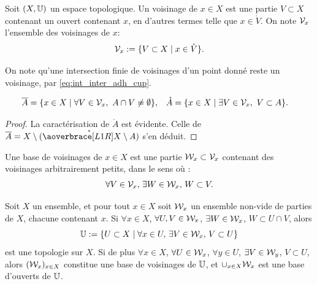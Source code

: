 \begin{definition}
\label{def:filtre_vois}
%
	Soit $(X,\mathbb{U})$ un espace topologique. Un voisinage de $x \in X$ est une partie $V\subset X$ contenant un ouvert contenant $x$, en d'autres termes telle que $x \in \mathring V$. On note $\mathcal{V}_x$ l'ensemble des voisinages de $x$:
	\begin{equation}
	\label{eqdef:Vx}
		\cV_x := \{V \subset X \mid x \in \mathring V\}.
\leancheck{eqdef:Vx}%
	\end{equation}
\end{definition}
On note qu'une intersection finie de voisinages d'un point donné reste un voisinage, par \eqref{eq:int_inter_adh_cup}.

\begin{proposition}
\label{prop:adh_vois}
%
\begin{align*}
	\overline A &= \{x \in X \mid \forall V \in \mathcal{V}_x,\ A\cap V \neq \emptyset\},&
	\mathring A &= \{x \in X \mid \exists V \in \mathcal{V}_x,\ V \subset A\}.
\end{align*}
\end{proposition}

\begin{proof}
La caractérisation de $\mathring A$ est évidente. Celle de $\overline A = X \sm (\mathring{\overpar{X \sm A}})$ s'en déduit.
\end{proof}



\begin{definition}
\label{def:base_vois}
%
	Une base de voisinages de $x\in X$ est une partie $\mathcal{W}_x \subset \mathcal{V}_x$ contenant des voisinages arbitrairement petits, dans le sens où : 
	\begin{equation}
		\forall V \in \mathcal{V}_x,\, \exists W \in \mathcal{W}_x,\, W \subset V.
	\end{equation}
\end{definition}

\begin{remark}
\label{rem:topoVois}
%
Soit $X$ un ensemble, et pour tout $x \in X$ soit $\mathcal{W}_x$ un ensemble non-vide de parties de $X$, chacune contenant $x$.
Si $\forall x \in X$, $\forall U,V \in \mathcal{W}_x$, $\exists W \in \mathcal{W}_x$, $W \subset U \cap V$, alors 
$$\mathbb{U} := \{U \subset X \mid \forall x \in U,\, \exists V \in \mathcal{W}_x,\, V \subset U\}$$ 
est une topologie sur $X$.
Si de plus $\forall x\in X$, $\forall U \in \mathcal{W}_x$, $\forall y\in U$, $\exists V \in \mathcal{W}_y$, $V \subset U$, alors $(\mathcal{W}_x)_{x\in X}$ constitue une base de voisinages de $\mathbb{U}$, et $\cup_{x \in X} \mathcal{W}_x$ est une base d'ouverts de $\mathbb{U}$.
\end{remark}

